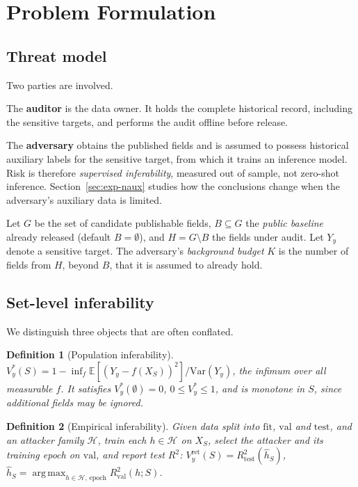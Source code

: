 \documentclass[preprint,12pt]{elsarticle}
\newtheorem{definition}{Definition}
\newcommand{\Vy}{V_{y}}
\newcommand{\Rtwo}{R^{2}}
\DeclareMathOperator*{\argmax}{arg\,max}
\begin{document}
\section{Problem Formulation}\label{sec:problem}

\subsection{Threat model}
Two parties are involved.

The \textbf{auditor} is the data owner. It holds the complete historical record, including
the sensitive targets, and performs the audit offline before release.

The \textbf{adversary} obtains the published fields and is assumed to possess historical
auxiliary labels for the sensitive target, from which it trains an inference model. Risk is
therefore \emph{supervised inferability}, measured out of sample, not zero-shot inference.
Section~\ref{sec:exp-naux} studies how the conclusions change when the adversary's auxiliary
data is limited.

Let $G$ be the set of candidate publishable fields, $B \subseteq G$ the \emph{public
baseline} already released (default $B=\emptyset$), and $H = G \setminus B$ the fields under
audit. Let $Y_y$ denote a sensitive target. The adversary's \emph{background budget} $K$ is
the number of fields from $H$, beyond $B$, that it is assumed to already hold.

\subsection{Set-level inferability}
We distinguish three objects that are often conflated.

\begin{definition}[Population inferability]
$\Vy^{*}(S) = 1 - \inf_{f}\mathbb{E}[(Y_y - f(X_S))^{2}] / \mathrm{Var}(Y_y)$,
the infimum over all measurable $f$. It satisfies $\Vy^{*}(\emptyset)=0$,
$0 \le \Vy^{*} \le 1$, and is monotone in $S$, since additional fields may be ignored.
\end{definition}

\begin{definition}[Empirical inferability]
Given data split into $\mathrm{fit}$, $\mathrm{val}$ and $\mathrm{test}$, and an attacker
family $\mathcal{H}$, train each $h \in \mathcal{H}$ on $X_S$, select the attacker and its
training epoch on $\mathrm{val}$, and report test $\Rtwo$:
$\Vy^{\mathrm{ret}}(S) = \Rtwo_{\mathrm{test}}(\hat h_S)$,
$\hat h_S = \argmax_{h \in \mathcal{H},\,\mathrm{epoch}} \Rtwo_{\mathrm{val}}(h;S)$.
\end{definition}
\end{document}
